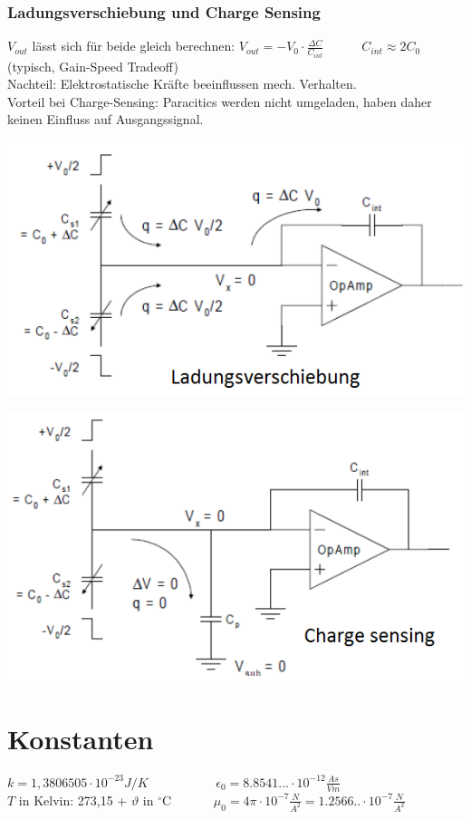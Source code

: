 \subsubsection{Ladungsverschiebung und Charge Sensing}
 $V_{out}$ lässt sich für beide gleich berechnen:   $V_{out}=-V_0 \cdot \frac{\Delta C }{C_{int}}\quad \quad \quad C_{int} \approx 2C_0$  (typisch, Gain-Speed Tradeoff)   \\
Nachteil: Elektrostatische Kräfte beeinflussen mech. Verhalten.\\
Vorteil bei Charge-Sensing: Paracitics werden nicht umgeladen, haben daher keinen Einfluss auf Ausgangssignal.
\hfill
\begin{minipage}{0.45\textwidth}
    \vspace{0pt}
    \hspace{-0.7cm}
    \includegraphics[width=1.0\textwidth]{images/Ladungsverschiebung}
\end{minipage}
\hfill
\begin{minipage}{0.45\textwidth}
    \vspace{0pt}
    \includegraphics[width=1.0\textwidth]{images/charge_sensing}
\end{minipage}

\section{Konstanten}
$k = 1,3806505 \cdot 10^{-23} J/K$ \ \ \ \ \ \ \ \ \ \ $\epsilon_0 = 8.8541...\cdot 10^{-12} \frac{As}{Vm}$ \\
$T$ in Kelvin: 273,15 +  $\vartheta$  in $^\circ $C \ \ \ \ \ \
$\mu _0 = 4\pi \cdot 10^{-7} \frac{N}{A^2}=1.2566..\cdot 10^{-7} \frac{N}{A^2}$

